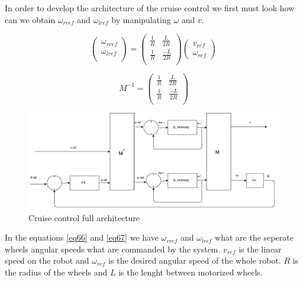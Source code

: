 In order to develop the architecture of the cruise control we first must look how can we obtain $\omega_{rref}$ and $\omega_{lref}$ by manipulating $\omega$ and $v$.

\begin{equation} \label{eq66}
 \begin{pmatrix} 
 \omega_{rref} \\ 
 \omega_{lref} \\
 \end{pmatrix} 
 =
 \begin{pmatrix}  
 \frac{1}{R}   & \frac{L}{2R} \\ 
 \frac{1}{R} & \frac{-L}{2R} \\ 
 \end{pmatrix}
 \begin{pmatrix} 
 v_{ref} \\ 
 \omega_{ref}
 \end{pmatrix} 
 \end{equation} 

\begin{equation} \label{eq67}
M^{-1}
=
\begin{pmatrix}  
 \frac{1}{R}   & \frac{L}{2R} \\ 
 \frac{1}{R} & \frac{-L}{2R} \\ 
 \end{pmatrix} 
\end{equation}

\begin{figure}
\centering
 	\includegraphics[width=1\textwidth]{figures/cruisecontrol.pdf}
	\caption{Cruise control full architecture} 
 	\label{fig:cruisecontrol} 
\end{figure}

In the equations \ref{eq66} and \ref{eq67} we have $\omega_{rref}$ and $\omega_{lref}$ what are the seperate wheels angular speeds what are commanded by the system. $v_{ref}$ is the linear speed on the robot and $\omega_{ref}$ is the desired angular speed of the whole robot. $R$ is the radius of the wheels and $L$ is the lenght between motorized wheels.

